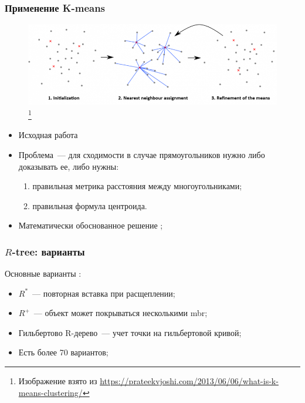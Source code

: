 \documentclass{beamer}
\begin{document}
\begin{frame}
\frametitle{Применение K-means}

  \begin{figure}[htb]
  \includegraphics[width=\textwidth,height=0.4\textheight,keepaspectratio]{steps-of-kmeans.png} 
  \footnote{\tiny{Изображение взято из \url{https://prateekvjoshi.com/2013/06/06/what-is-k-means-clustering/}}}
  \end{figure}   

\begin{itemize}
  \item Исходная работа \cite{Brakatsoulas2002}
  \item Проблема~--- для сходимости в случае прямоугольников нужно либо доказывать ее, либо нужны: 
  \begin{enumerate}
    \item правильная метрика расстояния между многоугольниками;
    \item правильная формула центроида.
  \end{enumerate}
  \item Математически обоснованное решение \cite{Grigorev2016};
\end{itemize}

\end{frame}

\begin{frame}
\frametitle{$R$-tree: варианты}

Основные варианты \cite{Papadopoulos2009}:

\begin{itemize}
  \setlength\itemsep{1em}
  \item $R^*$~--- повторная вставка при расщеплении;
  \item $R^+$~--- объект может покрываться несколькими mbr;
  \item Гильбертово R-дерево~--- учет точки на гильбертовой кривой;
  \item Есть более 70 вариантов;
\end{itemize}

\end{frame}
\end{document}
